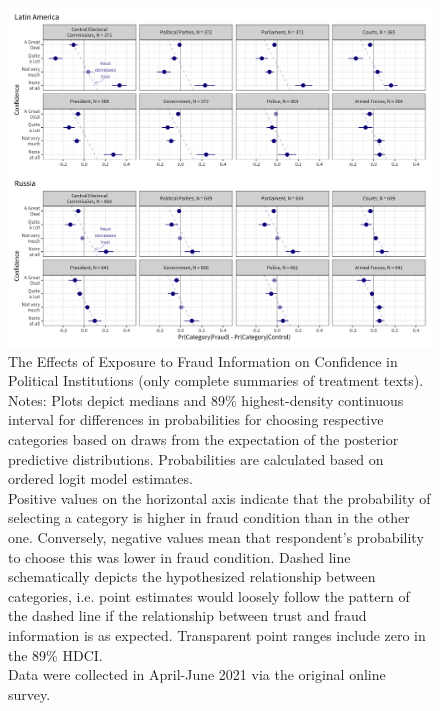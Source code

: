 \documentclass[11pt, ngerman,english,a4]{article}
\begin{document}
\begin{figure}[H]
	\centering
	\includegraphics[width=\linewidth,trim=4 4 4 4,clip]{figs/main_hdi89_3.png}
	\caption{The Effects of Exposure to Fraud Information on Confidence in Political Institutions (only complete summaries of treatment texts).  \\
		\footnotesize{Notes: Plots depict medians and 89\% highest-density continuous interval for differences in probabilities for choosing respective categories based on draws from the expectation of the posterior predictive distributions. Probabilities are calculated based on ordered logit model estimates.\\
			Positive values on the horizontal axis indicate that the probability of selecting a category is higher in fraud condition than in the other one. Conversely, negative values mean that respondent's probability to choose this was lower in fraud condition. Dashed line schematically depicts the hypothesized relationship between categories, i.e. point estimates would loosely follow the pattern of the dashed line if the relationship between trust and fraud information is as expected. Transparent point ranges include zero in the 89\% HDCI.\\
	Data were collected in April-June 2021 via the original online survey. } }
	\singlespacing
	\raggedright
	    
	\label{fig:main-3}
\end{figure}
\end{document}
